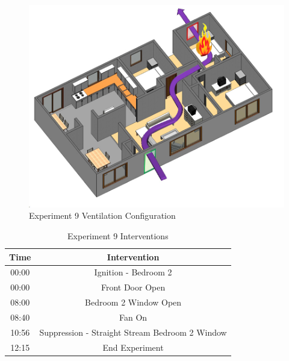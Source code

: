 \documentclass{article}
\begin{document}
\begin{figure}[H]
	\centering
	\includegraphics[width=5in]{0_Images/FireExperiments/Single_Story/Experiment_9.jpg}
	\caption{Experiment 9 Ventilation Configuration}
	\label{fig:Exp9VentConfig}
\end{figure}

\begin{table}[H]
	\centering
	\caption{Experiment 9 Interventions}
	\begin{tabular}{|c|c|} 
		\hline
		Time & Intervention \\ \hline \hline
		00:00 & Ignition - Bedroom 2 \\ \hline
		00:00 & Front Door Open \\ \hline
		08:00 & Bedroom 2 Window Open\\ \hline
		08:40 & Fan On\\ \hline
		10:56 & Suppression - Straight Stream Bedroom 2 Window\\ \hline
		12:15 & End Experiment\\ \hline
	\end{tabular}
	\label{Table:Exp9Interventions}
\end{table}

\clearpage
\end{document}
